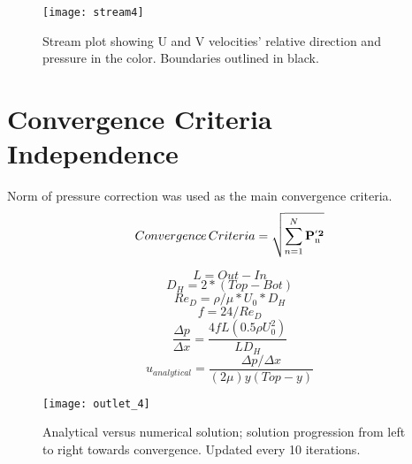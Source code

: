 \documentclass[10pt,english]{article}
\begin{document}
\begin{figure}[htbp]
\centering
\texttt{[image: stream4]}
\vspace{-5pt}
\caption{Stream plot showing U and V velocities' relative direction and pressure in the color. Boundaries outlined in black.}
\label{f:3b}
\end{figure}




\FloatBarrier
\section{Convergence Criteria Independence}



\noindent Norm of pressure correction was used as the main convergence criteria.
    \begin{equation}
      Convergence\,Criteria = \sqrt{\sum_{n=1}^N \bf P_{\rm n}^{'2}}
    \end{equation}

\begin{equation}
            L = Out-In
\end{equation}
\begin{equation}
            D_H = 2*(Top-Bot)
            \end{equation}
            \begin{equation}
            Re_D = \rho/\mu*U_0*D_H
            \end{equation}
            \begin{equation}
            f = 24/Re_D
            \end{equation}
            \begin{equation}
            \frac{\Delta p}{\Delta x} = \frac{4 f L (0.5 \rho U_0^2)}{L D_H}
            \end{equation}
            \begin{equation}
            u_{analytical} = \frac{{\Delta p}/{\Delta x}}{(2 \mu) y (Top-y)}
            \end{equation}
      
\begin{figure}[htbp]
\centering
\texttt{[image: outlet\_4]}
\vspace{-5pt}
\caption{Analytical versus numerical solution; solution progression from left to right towards convergence.  Updated every 10 iterations.}
\label{f:3b}
\end{figure}
\end{document}
